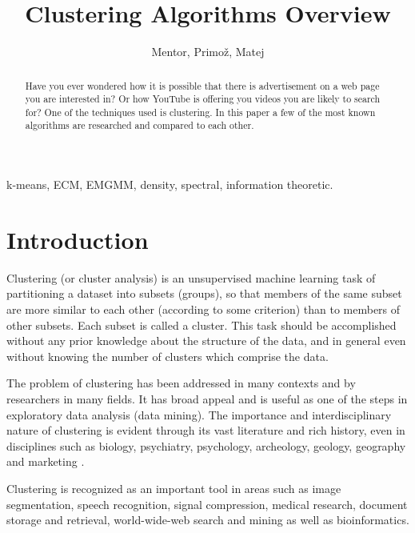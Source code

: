 \documentclass[conference]{IEEEtran}
\begin{document}
\title{Clustering Algorithms Overview}
\author{Mentor, Primož, Matej}
\maketitle

\begin{abstract}
Have you ever wondered how it is possible that there is advertisement on a web page you
are interested in? Or how YouTube is offering you videos you are likely to search for? 
One of the techniques used is clustering. In this paper a few of the most known
algorithms are researched and compared to each other.
\end{abstract}

\begin{IEEEkeywords}
k-means, ECM, EMGMM, density, spectral, information theoretic.
\end{IEEEkeywords}

\section{Introduction}
Clustering (or cluster analysis) is an unsupervised machine learning task of partitioning
a dataset into subsets (groups), so that members of the same subset are more similar to each other
(according to some criterion) than to members of other subsets. Each subset is called a cluster.
This task should be accomplished without any prior knowledge about the structure of the data, and in general
even without knowing the number of clusters which comprise the data.

The problem of clustering has been addressed in many contexts and by researchers in many fields. It has
broad appeal and is useful as one of the steps in exploratory data analysis (data mining). The importance
and interdisciplinary nature of clustering is evident through its vast literature and rich history, even
in disciplines such as biology, psychiatry, psychology, archeology, geology, geography and
marketing \cite{jaindubes88}.%

Clustering is recognized as an important tool in areas such as image segmentation,
speech recognition, signal compression, medical research, document storage and retrieval,
world-wide-web search and mining as well as bioinformatics.
\end{document}
